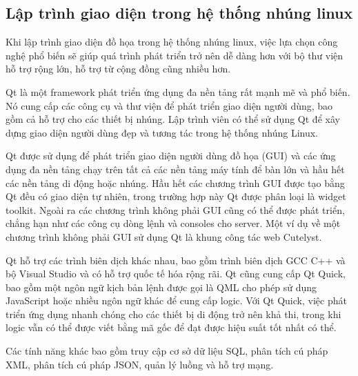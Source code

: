\documentclass{report}
\begin{document}
\subsection{Lập trình giao diện trong hệ thống nhúng linux}
Khi lập trình giao diện đồ họa trong hệ thống nhúng linux, việc lựa chọn công nghệ phổ biến sẽ giúp quá trình phát triển trở nên dễ dàng hơn với bộ thư viện hỗ trợ rộng lớn, hỗ trợ từ cộng đồng cũng nhiều hơn.

Qt là một framework phát triển ứng dụng đa nền tảng rất mạnh mẽ và phổ biến. Nó cung cấp các công cụ và thư viện để phát triển giao diện người dùng, bao gồm cả hỗ trợ cho các thiết bị nhúng. Lập trình viên có thể sử dụng Qt để xây dựng giao diện người dùng đẹp và tương tác trong hệ thống nhúng Linux.

Qt được sử dụng để phát triển giao diện người dùng đồ họa (GUI) và các ứng dụng đa nền tảng chạy trên tất cả các nền tảng máy tính để bàn lớn và hầu hết các nền tảng di động hoặc nhúng. Hầu hết các chương trình GUI được tạo bằng Qt đều có giao diện tự nhiên, trong trường hợp này Qt được phân loại là widget toolkit. Ngoài ra các chương trình không phải GUI cũng có thể được phát triển, chẳng hạn như các công cụ dòng lệnh và consoles cho server. Một ví dụ về một chương trình không phải GUI sử dụng Qt là khung công tác web Cutelyst.

Qt hỗ trợ các trình biên dịch khác nhau, bao gồm trình biên dịch GCC C++ và bộ Visual Studio và có hỗ trợ quốc tế hóa rộng rãi. Qt cũng cung cấp Qt Quick, bao gồm một ngôn ngữ kịch bản lệnh được gọi là QML cho phép sử dụng JavaScript hoặc nhiều ngôn ngữ khác để cung cấp logic. Với Qt Quick, việc phát triển ứng dụng nhanh chóng cho các thiết bị di động trở nên khả thi, trong khi logic vẫn có thể được viết bằng mã gốc để đạt được hiệu suất tốt nhất có thể.

Các tính năng khác bao gồm truy cập cơ sở dữ liệu SQL, phân tích cú pháp XML, phân tích cú pháp JSON, quản lý luồng và hỗ trợ mạng. 
\end{document}
